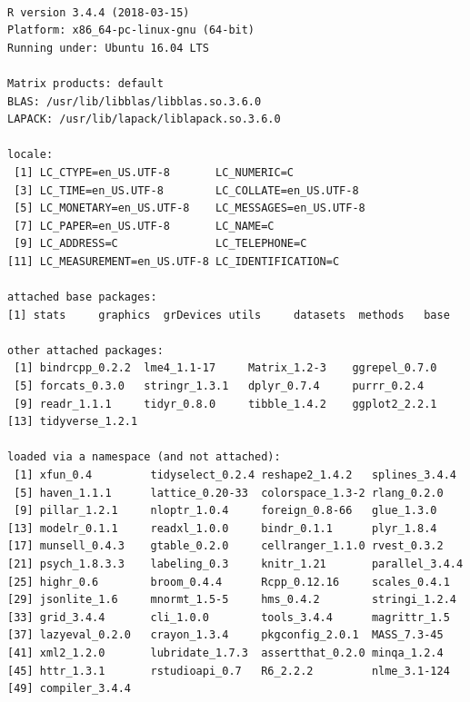 \documentclass[11pt]{article}
\begin{document}
\begin{verbatim}

R version 3.4.4 (2018-03-15)
Platform: x86_64-pc-linux-gnu (64-bit)
Running under: Ubuntu 16.04 LTS

Matrix products: default
BLAS: /usr/lib/libblas/libblas.so.3.6.0
LAPACK: /usr/lib/lapack/liblapack.so.3.6.0

locale:
 [1] LC_CTYPE=en_US.UTF-8       LC_NUMERIC=C              
 [3] LC_TIME=en_US.UTF-8        LC_COLLATE=en_US.UTF-8    
 [5] LC_MONETARY=en_US.UTF-8    LC_MESSAGES=en_US.UTF-8   
 [7] LC_PAPER=en_US.UTF-8       LC_NAME=C                 
 [9] LC_ADDRESS=C               LC_TELEPHONE=C            
[11] LC_MEASUREMENT=en_US.UTF-8 LC_IDENTIFICATION=C       

attached base packages:
[1] stats     graphics  grDevices utils     datasets  methods   base     

other attached packages:
 [1] bindrcpp_0.2.2  lme4_1.1-17     Matrix_1.2-3    ggrepel_0.7.0  
 [5] forcats_0.3.0   stringr_1.3.1   dplyr_0.7.4     purrr_0.2.4    
 [9] readr_1.1.1     tidyr_0.8.0     tibble_1.4.2    ggplot2_2.2.1  
[13] tidyverse_1.2.1

loaded via a namespace (and not attached):
 [1] xfun_0.4         tidyselect_0.2.4 reshape2_1.4.2   splines_3.4.4   
 [5] haven_1.1.1      lattice_0.20-33  colorspace_1.3-2 rlang_0.2.0     
 [9] pillar_1.2.1     nloptr_1.0.4     foreign_0.8-66   glue_1.3.0      
[13] modelr_0.1.1     readxl_1.0.0     bindr_0.1.1      plyr_1.8.4      
[17] munsell_0.4.3    gtable_0.2.0     cellranger_1.1.0 rvest_0.3.2     
[21] psych_1.8.3.3    labeling_0.3     knitr_1.21       parallel_3.4.4  
[25] highr_0.6        broom_0.4.4      Rcpp_0.12.16     scales_0.4.1    
[29] jsonlite_1.6     mnormt_1.5-5     hms_0.4.2        stringi_1.2.4   
[33] grid_3.4.4       cli_1.0.0        tools_3.4.4      magrittr_1.5    
[37] lazyeval_0.2.0   crayon_1.3.4     pkgconfig_2.0.1  MASS_7.3-45     
[41] xml2_1.2.0       lubridate_1.7.3  assertthat_0.2.0 minqa_1.2.4     
[45] httr_1.3.1       rstudioapi_0.7   R6_2.2.2         nlme_3.1-124    
[49] compiler_3.4.4
\end{verbatim}
\end{document}
